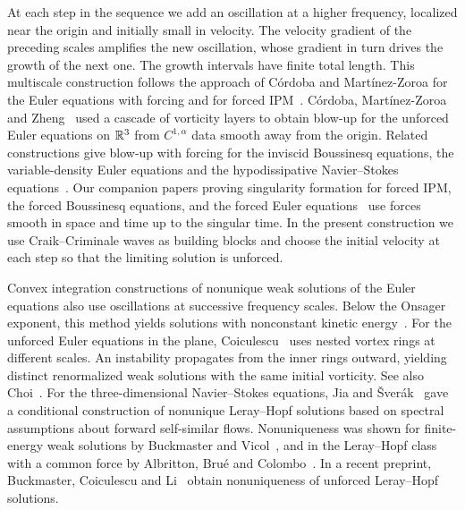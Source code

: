 At each step in the sequence we add an oscillation at a higher frequency, localized
near the origin and initially small in velocity. The velocity gradient
of the preceding scales amplifies the new oscillation, whose gradient
in turn drives the growth of the next one. The growth intervals have
finite total length. This multiscale construction follows the approach of C\'ordoba and
Mart\'inez-Zoroa for the Euler equations with forcing and for forced
IPM~\cite{CMZForcedEuler,CMZForcedIPM}.
C\'ordoba, Mart\'inez-Zoroa and Zheng~\cite{CMZUnforcedEuler} used a cascade of
vorticity layers to obtain blow-up for the unforced Euler equations
on $\mathbb R^3$ from $C^{1,\alpha}$ data
smooth away from the origin. Related constructions give blow-up with forcing
for the inviscid Boussinesq equations, the variable-density Euler equations
and the hypodissipative Navier--Stokes equations~\cite{CLMZForcedBoussinesq,CLMZNonhomogeneousEuler,CMZHypodissipativeNS}.
Our companion papers proving singularity formation for forced IPM,
the forced Boussinesq equations, and the forced Euler
equations~\cite{AlpogeBuckmasterCoiculescuIPM,AlpogeBuckmasterBoussinesq,AlpogeBuckmasterForcedEuler}
use forces smooth in space and time up to the singular time. In the
present construction we use Craik--Criminale waves as building blocks
and choose the initial velocity at each step so that the limiting
solution is unforced.

Convex integration constructions of nonunique weak solutions of the Euler equations
also use oscillations at successive frequency scales. Below the Onsager
exponent, this method yields solutions with nonconstant kinetic
energy~\cite{IsettOnsager,BDLSVOnsager}. For the unforced Euler equations
in the plane, Coiculescu~\cite{CoiculescuEulerI,CoiculescuEulerII}
uses nested vortex rings at different scales. An instability propagates
from the inner rings outward, yielding distinct renormalized weak
solutions with the same initial vorticity. See also Choi~\cite{ChoiEulerNonuniqueness}.
For the three-dimensional Navier--Stokes equations, Jia and
\v{S}ver\'ak~\cite{JiaSverak2015} gave a conditional construction of
nonunique Leray--Hopf solutions based
on spectral assumptions about forward self-similar flows.
Nonuniqueness was shown for
finite-energy weak solutions by Buckmaster and Vicol~\cite{BuckmasterVicolNS},
and in the Leray--Hopf class with a common force by Albritton, Bru\'e and
Colombo~\cite{AlbrittonBrueColombo}. In a recent preprint, Buckmaster,
Coiculescu and Li~\cite{BuckmasterCoiculescuLiNS} obtain nonuniqueness
of unforced Leray--Hopf solutions.

